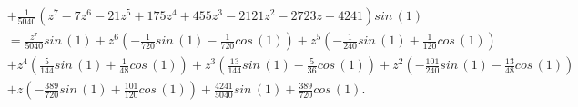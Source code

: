 \begin{description}
\begin{displaymath}
\begin{split}
                             &+ \frac{1}{5040} \left(z^{7} - 7 z^{6} - 21 z^{5} + 175 z^{4} + 455 z^{3} - 2121 z^{2} - 2723 z + 4241\right) sin\,{\left (1 \right )}\\
                             &= \frac{z^{7}}{5040} sin\,{\left (1 \right )} + z^{6} \left(- \frac{1}{720} sin\,{\left (1 \right )} - \frac{1}{720} cos\,{\left (1 \right )}\right) + z^{5} \left(- \frac{1}{240} sin\,{\left (1 \right )} + \frac{1}{120} cos\,{\left (1 \right )}\right) \\
                             &+ z^{4} \left(\frac{5}{144} sin\,{\left (1 \right )} + \frac{1}{48} cos\,{\left (1 \right )}\right) + z^{3} \left(\frac{13}{144} sin\,{\left (1 \right )} - \frac{5}{36} cos\,{\left (1 \right )}\right) + z^{2} \left(- \frac{101}{240} sin\,{\left (1 \right )} - \frac{13}{48} cos\,{\left (1 \right )}\right) \\
                             &+ z \left(- \frac{389}{720} sin\,{\left (1 \right )} + \frac{101}{120} cos\,{\left (1 \right )}\right) + \frac{4241}{5040} sin\,{\left (1 \right )} + \frac{389}{720} cos\,{\left (1 \right )}.
    \end{split}
\end{displaymath}
\end{description}
